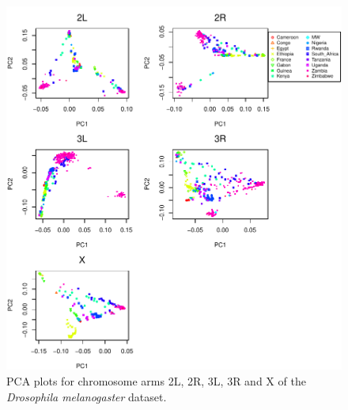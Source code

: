 \documentclass[11pt, oneside]{article}   	%
\begin{document}
\begin{figure}
    \begin{center}
       \includegraphics[width=1\textwidth]{FigS_pca_plots_allchr_drosophila}
    \end{center}
    \caption{
        PCA plots for chromosome arms 2L, 2R, 3L, 3R and X of the \textit{Drosophila melanogaster} dataset.
        \label{fig:pca_drosophila_allchr}
    }
\end{figure}
\end{document}
